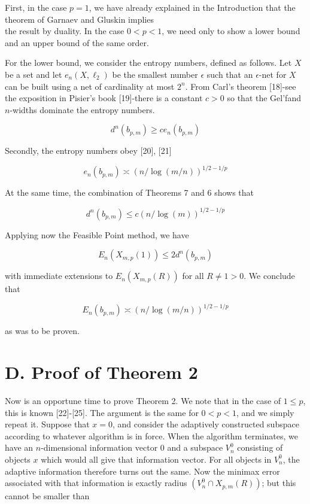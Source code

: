 \documentclass[10pt]{article}
\begin{document}
First, in the case $p=1$, we have already explained in the Introduction that the theorem of Garnaev and Gluskin implies\\
the result by duality. In the case $0<p<1$, we need only to show a lower bound and an upper bound of the same order.

For the lower bound, we consider the entropy numbers, defined as follows. Let $X$ be a set and let $e_{n}\left(X, \ell_{2}\right)$ be the smallest number $\epsilon$ such that an $\epsilon$-net for $X$ can be built using a net of cardinality at most $2^{n}$. From Carl's theorem [18]-see the exposition in Pisier's book [19]-there is a constant $c>0$ so that the Gel'fand $n$-widths dominate the entropy numbers.

$$
d^{n}\left(b_{p, m}\right) \geq c e_{n}\left(b_{p, m}\right)
$$

Secondly, the entropy numbers obey [20], [21]

$$
e_{n}\left(b_{p, m}\right) \asymp(n / \log (m / n))^{1 / 2-1 / p}
$$

At the same time, the combination of Theorems 7 and 6 shows that

$$
d^{n}\left(b_{p, m}\right) \leq c(n / \log (m))^{1 / 2-1 / p}
$$

Applying now the Feasible Point method, we have

$$
E_{n}\left(X_{m, p}(1)\right) \leq 2 d^{n}\left(b_{p, m}\right)
$$

with immediate extensions to $E_{n}\left(X_{m, p}(R)\right)$ for all $R \neq 1>0$. We conclude that

$$
E_{n}\left(b_{p, m}\right) \asymp(n / \log (m / n))^{1 / 2-1 / p}
$$

as was to be proven.

\section*{D. Proof of Theorem 2}
Now is an opportune time to prove Theorem 2. We note that in the case of $1 \leq p$, this is known [22]-[25]. The argument is the same for $0<p<1$, and we simply repeat it. Suppose that $x=0$, and consider the adaptively constructed subspace according to whatever algorithm is in force. When the algorithm terminates, we have an $n$-dimensional information vector 0 and a subspace $V_{n}^{0}$ consisting of objects $x$ which would all give that information vector. For all objects in $V_{n}^{0}$, the adaptive information therefore turns out the same. Now the minimax error associated with that information is exactly radius $\left(V_{n}^{0} \cap X_{p, m}(R)\right)$; but this cannot be smaller than
\end{document}
